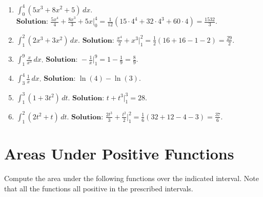 \documentclass{article}
\begin{document}
\begin{enumerate}[leftmargin=0.5cm, label=(\alph*), rightmargin=0.2cm]

    \item $\int_0^4 (5x^3 + 8x^2 + 5) \, dx$.\quad
    \(
    \textbf{Solution: } \frac{5x^4}{4} + \frac{8x^3}{3} + 5x\Big|_0^4 = \frac{1}{12}(15 \cdot 4^4 + 32\cdot 4^3 + 60\cdot 4) = \frac{1532}{3}.
    \)

    \item $\int_1^2 (2x^3 + 3x^2) \, dx$.\quad
    \(
    \textbf{Solution: } \frac{x^4}{2} + x^3\Big|_1^2 = \frac{1}{2}(16 + 16 - 1 - 2) = \frac{29}{2}.
    \)

    \item $\int_1^9 \frac{x}{x^3} \, dx$.\quad
    \(
    \textbf{Solution: } -\frac{1}{x}\Big|_1^9 = 1 - \frac{1}{9} = \frac{8}{9}.
    \)

    \item $\int_3^4 \frac{1}{x} \, dx$.\quad
    \(
    \textbf{Solution: } \ln(4) - \ln(3).
    \)

    \item $\int_1^3 (1 + 3t^2) \, dt$.\quad
    \(
    \textbf{Solution: } t + t^3\Big|_1^3 = 28.
    \)

    \item $\int_1^2 (2t^2 + t) \, dt$.\quad
    \(
    \textbf{Solution: } \frac{2t^3}{3} + \frac{t^2}{2}\Big|_1^2 = \frac{1}{6}(32 + 12 - 4 - 3) = \frac{37}{6}.
    \)

\end{enumerate}


\section*{Areas Under Positive Functions}

Compute the area under the following functions over the indicated interval. Note that all the functions all positive in the prescribed intervals.
\end{document}
